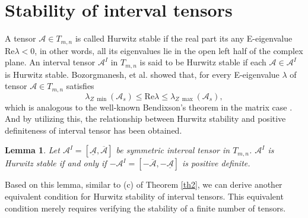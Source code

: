 \documentclass[twoside]{article}
\newtheorem{lemma}{Lemma}[section]
\begin{document}
\vspace{.3cm}

\section{Stability of interval tensors}
\setcounter{section}{4}
A tensor $\mathcal{A}\in T_{m,n}$ is called Hurwitz stable if the real part its any E-eigenvalue Re$\lambda < 0$, in other words, all its eigenvalues lie in the open left half of the complex plane. An interval tensor $\mathcal{A}^I$ in $T_{m,n}$ is said to be Hurwitz stable if each $\mathcal{A}\in \mathcal{A}^I$ is Hurwitz stable. Bozorgmanesh, et al. showed that, for every E-eigenvalue $\lambda$ of tensor $\mathcal{A}\in T_{m,n}$ satisfies
\begin{equation}\label{Bth}
\lambda_{Z~\min}(\mathcal{A}_s)\leq \mbox{Re} \lambda\leq\lambda_{Z~\max}(\mathcal{A}_s),
\end{equation}
which is analogous to the well-known Bendixson's theorem in the matrix case \cite{bth,boz2020}. %
And by utilizing this, the relationship between Hurwitz stability and positive definiteness of interval tensor has been obtained.
\begin{lemma}\label{sta}\textup{\cite{boz2020}}
Let $\mathcal{A}^I=[\underline{\mathcal{A}},\overline{\mathcal{A}}]$ be symmetric interval tensor in $T_{m,n}$. $\mathcal{A}^I$ is Hurwitz stable if and only
if $-\mathcal{A}^I=[-\overline{\mathcal{A}},-\underline{\mathcal{A}}]$ is positive definite.
\end{lemma}
Based on this lemma, similar to (c) of Theorem \ref{th2}, we can derive another equivalent condition for Hurwitz stability of interval tensors. This equivalent condition merely requires verifying the stability of a finite number of tensors.
\end{document}
